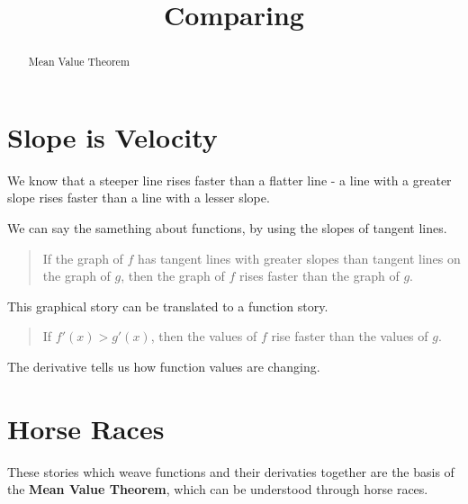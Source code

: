 \documentclass{ximera}
\title{Comparing}
\begin{document}
\begin{abstract}
Mean Value Theorem
\end{abstract}
\maketitle






\section{Slope is Velocity}



We know that a steeper line rises faster than a flatter line - a line with a greater slope rises faster than a line with a lesser slope. 


We can say the samething about functions, by using the slopes of tangent lines.


\begin{quote}

If the graph of $f$ has tangent lines with greater slopes than tangent lines on the graph of $g$, then the graph of $f$ rises faster than the graph of $g$.

\end{quote}


This graphical story can be translated to a function story.  


\begin{quote}

If $f'(x) > g'(x)$, then the values of $f$ rise faster than the values of $g$.

\end{quote}





The derivative tells us how function values are changing. \\





\section{Horse Races}



These stories which weave functions and their derivaties together are the basis of the \textbf{Mean Value Theorem}, which can be understood through horse races. \\
\end{document}
